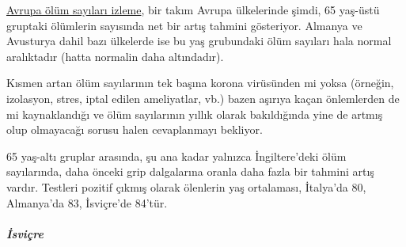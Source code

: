 \href{https://www.euromomo.eu/outputs/zscore_country_total.html}{Avrupa
ölüm sayıları izleme}, bir takım Avrupa ülkelerinde şimdi, 65 yaş-üstü
gruptaki ölümlerin sayısında net bir artış tahmini gösteriyor. Almanya
ve Avusturya dahil bazı ülkelerde ise bu yaş grubundaki ölüm sayıları
hala normal aralıktadır (hatta normalin daha altındadır).

Kısmen artan ölüm sayılarının tek başına korona virüsünden mi yoksa
(örneğin, izolasyon, stres, iptal edilen ameliyatlar, vb.) bazen aşırıya
kaçan önlemlerden de mi kaynaklandığı ve ölüm sayılarının yıllık olarak
bakıldığında yine de artmış olup olmayacağı sorusu halen cevaplanmayı
bekliyor.

65 yaş-altı gruplar arasında, şu ana kadar yalnızca İngiltere'deki ölüm
sayılarında, daha önceki grip dalgalarına oranla daha fazla bir tahmini
artış vardır. Testleri pozitif çıkmış olarak ölenlerin yaş ortalaması,
İtalya'da 80, Almanya'da 83, İsviçre'de 84'tür.

\hypertarget{isviuxe7re}{%
\subparagraph{\texorpdfstring{\textbf{İsviçre}}{İsviçre}}\label{isviuxe7re}}

